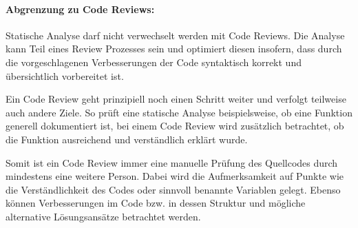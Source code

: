\paragraph{Abgrenzung zu Code Reviews:}
Statische Analyse darf nicht verwechselt werden mit Code Reviews. Die Analyse kann Teil eines Review Prozesses sein und optimiert diesen insofern, dass durch die vorgeschlagenen Verbesserungen der Code syntaktisch korrekt und übersichtlich vorbereitet ist.

Ein Code Review geht prinzipiell noch einen Schritt weiter und verfolgt teilweise auch andere Ziele. So prüft eine statische Analyse beispielsweise, ob eine Funktion generell dokumentiert ist, bei einem Code Review wird zusätzlich betrachtet, ob die Funktion ausreichend und verständlich erklärt wurde.

Somit ist ein Code Review immer eine manuelle Prüfung des Quellcodes durch mindestens eine weitere Person. Dabei wird die Aufmerksamkeit auf Punkte wie die Verständlichkeit des Codes oder sinnvoll benannte Variablen gelegt. Ebenso können Verbesserungen im Code bzw. in dessen Struktur und mögliche alternative Lösungsansätze betrachtet werden.
